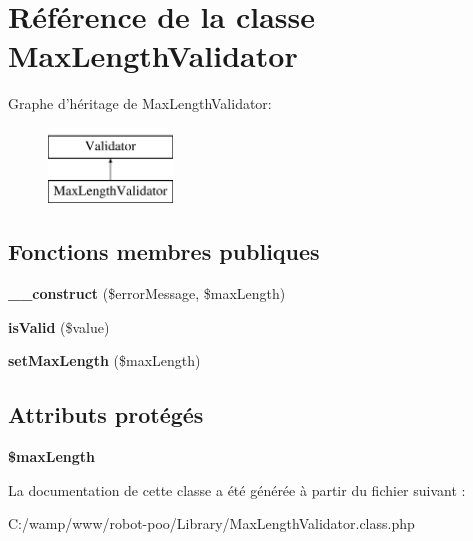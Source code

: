 \hypertarget{class_library_1_1_max_length_validator}{\section{Référence de la classe Max\+Length\+Validator}
\label{class_library_1_1_max_length_validator}
}
Graphe d'héritage de Max\+Length\+Validator\+:\begin{figure}[H]
\begin{center}
\leavevmode
\includegraphics[height=2.000000cm]{class_library_1_1_max_length_validator}
\end{center}
\end{figure}
\subsection*{Fonctions membres publiques}
\begin{DoxyCompactItemize}
\item 
\hypertarget{class_library_1_1_max_length_validator_a95bf53efd31ef66028abb0c4cf164358}{{\bfseries \+\_\+\+\_\+construct} (\$error\+Message, \$max\+Length)}\label{class_library_1_1_max_length_validator_a95bf53efd31ef66028abb0c4cf164358}

\item 
\hypertarget{class_library_1_1_max_length_validator_a72063d2e922edda5321b1970297eb0c3}{{\bfseries is\+Valid} (\$value)}\label{class_library_1_1_max_length_validator_a72063d2e922edda5321b1970297eb0c3}

\item 
\hypertarget{class_library_1_1_max_length_validator_a0cabf6bc3fd7c058ee339c28af5e91b0}{{\bfseries set\+Max\+Length} (\$max\+Length)}\label{class_library_1_1_max_length_validator_a0cabf6bc3fd7c058ee339c28af5e91b0}

\end{DoxyCompactItemize}
\subsection*{Attributs protégés}
\begin{DoxyCompactItemize}
\item 
\hypertarget{class_library_1_1_max_length_validator_aab871c2907a2cc6907062e8665fdb1f1}{{\bfseries \$max\+Length}}\label{class_library_1_1_max_length_validator_aab871c2907a2cc6907062e8665fdb1f1}

\end{DoxyCompactItemize}


La documentation de cette classe a été générée à partir du fichier suivant \+:\begin{DoxyCompactItemize}
\item 
C\+:/wamp/www/robot-\/poo/\+Library/Max\+Length\+Validator.\+class.\+php\end{DoxyCompactItemize}
